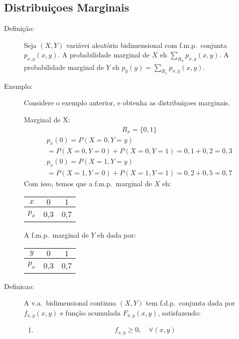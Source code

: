 \subsection{Distribuiçoes Marginais}
\begin{description}
\item [Definição:] 
  Seja $(X,Y)$ variávei aleatória bidimensional com f.m.p.\ conjunta $p_{x,y}(x,y)$. A probabilidade marginal de $X$ eh $\sum \limits_{R_{Y}} p_{x,y} (x,y)$. A probabilidade marginal de $Y$ eh $p_{y}(y) = \sum \limits_{R_{x}} p_{x,y}(x,y)$.
\item[Exemplo:] Considere o exemplo anterior, e obtenha as distribuiçoes marginais.

  Marginal de X:
  \begin{align*}
    R_{x} = \{ 0,1 \}
  \end{align*}
  \begin{align*}
    p_{x} (0) = P(X=0, Y=y)\\
    = P(X=0, Y=0) +P(X=0,Y=1)=0,1+0,2=0,3
  \end{align*}
  \begin{align*}
    p_{x} (0) = P(X=1, Y=y)\\
    = P(X=1, Y=0) +P(X=1,Y=1)=0,2+0,5=0,7
  \end{align*}
  Com isso, temos que a f.m.p.\ marginal de $X$ eh:
  \begin{table}[H]
    \centering
    \begin{tabular}{c c c}
      $x$ & $0$ &$1$ \\ \midrule
      $p_{x}$ & 0,3 & 0,7 \\
    \end{tabular}
  \end{table}
  A f.m.p.\ marginal de $Y$ eh dada por:
\begin{table}[H]
    \centering
    \begin{tabular}{c c c}
      $y$ & $0$ &$1$ \\ \midrule
      $p_{x}$ & 0,3 & 0,7 
    \end{tabular}
  \end{table}
\item [Definicao:] A v.a.\ bidimensional continua $(X,Y)$ tem f.d.p.\ conjunta dada por $f_{x,y}(x,y)$ e função acumulada $F_{x,y}(x,y)$, satisfazendo:
  \begin{enumerate}[leftmargin=*, label=\roman*., widest=IV, align=left]
    \item 
     \begin{align}
      f_{x,y} \geq 0, \quad \forall (x,y)

\end{align}
\end{enumerate}
\end{description}
